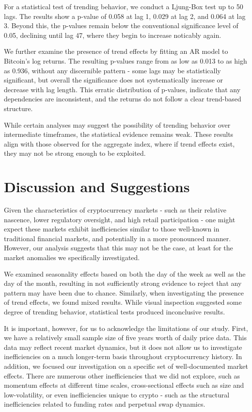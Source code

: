 \documentclass[
]{article}
\begin{document}
For a statistical test of trending behavior, we conduct a Ljung-Box test
up to 50 lags. The results show a p-value of 0.058 at lag 1, 0.029 at
lag 2, and 0.064 at lag 3. Beyond this, the p-values remain below the
conventional significance level of 0.05, declining until lag 47, where
they begin to increase noticably again.

We further examine the presence of trend effects by fitting an AR model
to Bitcoin's log returns. The resulting p-values range from as low as
0.013 to as high as 0.936, without any discernible pattern - some lags
may be statistically significant, but overall the significance does not
systematically increase or decrease with lag length. This erratic
distribution of p-values, indicate that any dependencies are
inconsistent, and the returns do not follow a clear trend-based
structure.

While certain analyses may suggest the possibility of trending behavior
over intermediate timeframes, the statistical evidence remains weak.
These results align with those observed for the aggregate index, where
if trend effects exist, they may not be strong enough to be exploited.

\section{Discussion and Suggestions}\label{discussion-and-suggestions}

Given the characteristics of cryptocurrency markets - such as their
relative nascence, lower regulatory oversight, and high retail
participation - one might expect these markets exhibit inefficiencies
similar to those well-known in traditional financial markets, and
potentially in a more pronounced manner. However, our analysis suggests
that this may not be the case, at least for the market anomalies we
specifically investigated.

We examined seasonality effects based on both the day of the week as
well as the day of the month, resulting in not sufficiently strong
evidence to reject that any pattern may have been due to chance.
Similarly, when investigating the presence of trend effects, we found
mixed results. While visual inspection suggested some degree of trending
behavior, statistical tests produced inconclusive results.

It is important, however, for us to acknowledge the limitations of our
study. First, we have a relatively small sample size of five years worth
of daily price data. This data may reflect recent market dynamics, but
it does not allow us to investigate inefficiencies on a much longer-term
basis throughout cryptocurrency history. In addition, we focused our
investigation on a specific set of well-documented market effects. There
are numerous other inefficiencies that we did not explore, such as
momentum effects at different time scales, cross-sectional effects such
as size and low-volatility, or even inefficiencies unique to crypto -
such as the structural inefficiencies related to funding rates and
perpetual swap dynamics.
\end{document}
